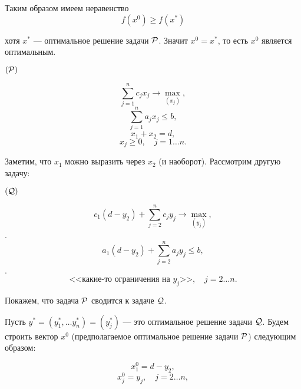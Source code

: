 Таким образом имеем неравенство
\[f(x^0) \ge f(x^*)\]

хотя $x^*$ --- оптимальное решение задачи $\P$. Значит $x^0 = x^*$, то есть $x^0$ является оптимальным.

\example

$(\P)$

\[\sum_{j=1}^{n} c_j x_j \to \max_{(x_j)},\]
\[\sum_{j=1}^{n} a_j x_j \le b,\]
\[x_1 + x_2 = d,\]
\[x_j \ge 0, \quad j = 1\dots n.\]

Заметим, что $x_1$ можно выразить через $x_2$ (и наоборот). Рассмотрим другую задачу:

$(\Q)$

\[c_1(d - y_2) + \sum_{j=2}^{n} c_j y_j \to \max_{(y_j)},\].
\[a_1 (d-y_2) + \sum_{j=2}^{n}a_j y_j \le b,\].
\[\text{<<какие-то ограничения на } y_j \text{>>}, \quad j=2 \dots n.\]

Покажем, что задача $\P$ сводится к задаче $\Q$.

\prooof

Пусть $y^* = (y^*_1, \dots y^*_n) = (y^*_j)$ --- это оптимальное решение задачи $\Q$. Будем строить вектор $x^0$ (предполагаемое оптимальное решение задачи $\P$) следующим образом:

\[x^0_1 = d - y_2,\]
\[x^0_j = y_j, \quad j = 2 \dots n,\]
